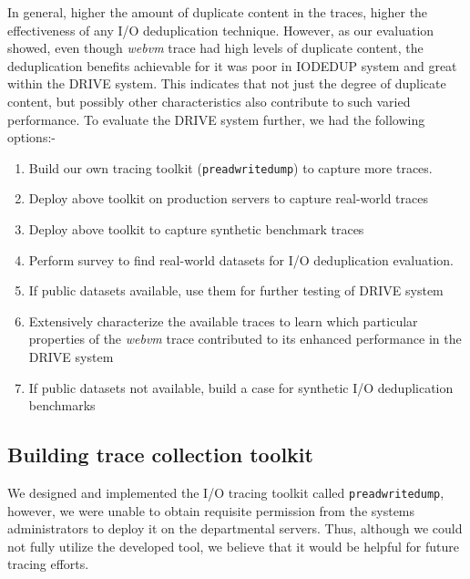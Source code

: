 In general, higher the amount of
duplicate content in the traces, higher the effectiveness of any
I/O deduplication technique.
However, as our evaluation showed,
even though \textit{webvm} trace had high levels
of duplicate content,
the deduplication benefits achievable for it was poor in IODEDUP system 
and great within the DRIVE system. This indicates that not just
the degree of duplicate content, but possibly other characteristics
also contribute to such varied performance.
To evaluate the DRIVE system further, we had the following options:-
\begin{enumerate}
		\singlespacing
    \item Build our own tracing toolkit (\texttt{preadwritedump}) to capture more traces.
    \item Deploy above toolkit on production servers to capture real-world traces
    \item Deploy above toolkit to capture synthetic benchmark traces
    \item Perform survey to find real-world datasets for I/O deduplication evaluation. 
    \item If public datasets available, use them for further testing of DRIVE system
    \item Extensively characterize the available traces to learn which particular properties of the \textit{webvm} trace contributed to its enhanced performance in the DRIVE system
    \item If public datasets not available, build a case for synthetic I/O deduplication benchmarks
\end{enumerate}

\subsection{Building trace collection toolkit}
We designed and implemented the I/O tracing toolkit 
called \texttt{preadwritedump}, however,
we were unable to obtain requisite permission from the systems
administrators to deploy it on the departmental servers. Thus, although
we could not fully utilize the developed tool, we believe that it would
be helpful for future tracing efforts.

